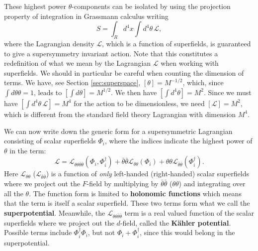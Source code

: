 \documentclass[notes.tex]{subfiles}
\begin{document}
These highest power $\theta$-components can be isolated by using the projection property of integration in Grassmann calculus writing
\[S=\int_R d^4x \int d^4\theta\, \mathcal{L},\]
where the Lagrangian density $\mathcal{L}$, which is a function of superfields, is guaranteed to give a supersymmetry invariant action. Note that this constitutes a redefinition of what we mean by the Lagrangian $\mathcal{L}$ when working with superfields. We should in particular be careful when counting the dimension of terms. We have, see Section \ref{sec:superspace}, $[\theta] = M^{-1/2}$, which, since $\int d\theta \theta=1$, leads to $[\int d\theta]=M^{1/2}$. We then have $[\int d^4\theta] = M^2$. Since we must have $[\int d^4\theta\, \mathcal{L}] = M^4$ for the action to be dimensionless, we need $[\mathcal{L}]=M^2$, which is different from the standard field theory Lagrangian with dimension $M^4$.

We can now write down the generic form for a supersymmetric Lagrangian consisting of scalar superfields $\Phi_i$, where the indices indicate the highest power of $\theta$ in the term:
\[\mathcal{L} = \mathcal{L}_{\theta \theta \bar{\theta} \bar{\theta}}(\Phi_i,\Phi_i^\dagger) + \bar{\theta}\bar{\theta}\mathcal{L}_{\theta\theta}(\Phi_i)+ \theta\theta \mathcal{L}_{\bar{\theta}\bar{\theta}}(\Phi_i^\dagger) .\]
Here $\mathcal{L}_{\theta\theta}$ ($\mathcal{L}_{\bar{\theta}\bar{\theta}}$)  is a function of {\it only}  left-handed (right-handed) scalar superfields where we project out the $F$-field by multiplying by $\bar{\theta}\bar{\theta}$ ($\theta\theta$) and integrating over all the $\theta$. The function form is limited to {\bf holonomic functions} which means that the term is itself a scalar superfield. These two terms form what we call the {\bf superpotential}.
Meanwhile, the $\mathcal{L}_{\theta \theta \bar{\theta} \bar{\theta}}$ term is a real valued function of the scalar superfields where we project out the $d$-field, called the {\bf Kähler potential}. Possible terms include $\Phi_i^\dagger\Phi_i$, but not $\Phi_i+\Phi_i^\dagger$, since this would belong in the superpotential.
\end{document}
